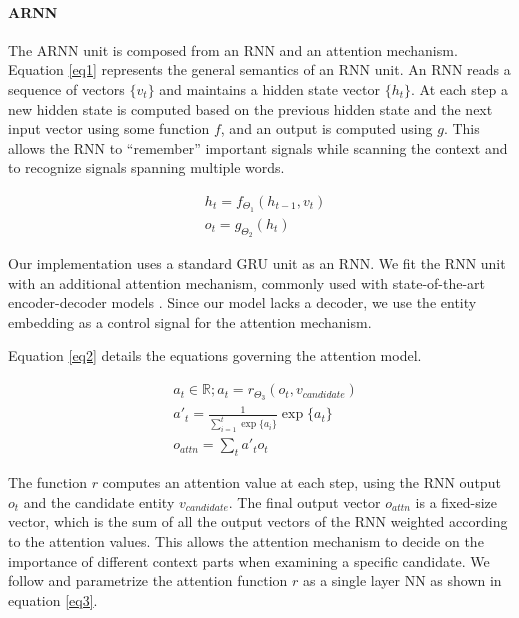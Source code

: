 \documentclass[11pt,letterpaper]{article}
\begin{document}
	\paragraph{ARNN}
	The ARNN unit is composed from an RNN and an attention mechanism. Equation \ref{eq1} represents the general semantics of an RNN unit. An RNN reads a sequence of vectors $\{v_t\}$ and maintains a hidden state vector $\{h_t\}$. At each step a new hidden state is computed based on the previous hidden state and the next input vector using some function $f$, and an output is computed using $g$. This allows the RNN to ``remember'' important signals while scanning the context and to recognize signals spanning multiple words.
	
	\begin{equation}
	\label{eq1}
	\begin{aligned}
	& h_t=f_{\Theta_1}(h_{t-1}, v_t) \\
	& o_t=g_{\Theta_2}(h_t)
	\end{aligned}
	\end{equation}
	
	Our implementation uses a standard GRU unit \cite{cho2014learning} as an RNN. We fit the RNN unit with an additional attention mechanism, commonly used with state-of-the-art encoder-decoder models \cite{bahdanau2014neural,xu2015show}. Since our model lacks a decoder, we use the entity embedding as a control signal for the attention mechanism.
	
	Equation \ref{eq2} details the equations governing the attention model.
	
	\begin{equation}
	\label{eq2}
	\begin{aligned}
	& a_t \in \mathbb{R}; a_t=r_{\Theta_3}(o_t, v_{candidate}) \\
	& a'_t  = \frac{1}{\sum_{i=1}^{t} \exp\{a_i\}} \exp \{a_t\} \\
	& o_{attn}=\sum_{t} a'_t o_t
	\end{aligned}
	\end{equation}
	
	The function $r$ computes an attention value at each step, using the RNN output $o_t$ and the candidate entity $v_{candidate}$. The final output vector $o_{attn}$ is a fixed-size vector, which is the sum of all the output vectors of the RNN weighted according to the attention values. This allows the attention mechanism to decide on the importance of different context parts when examining a specific candidate. We follow  and parametrize the attention function $r$ as a single layer NN as shown in equation \ref{eq3}.
	
\end{document}
